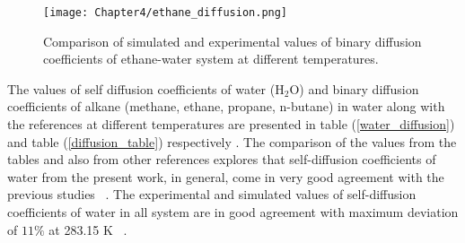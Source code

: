 \begin{figure}[h!]
 \centering
\texttt{[image: Chapter4/ethane\_diffusion.png]}
\caption[Comparison of simulated and experimental values of binary diffusion coefficients of ethane-water system.]{ Comparison of simulated and experimental values of binary diffusion coefficients of ethane-water system at different temperatures.}
\label{compare}
\end{figure}
 
 The values of self diffusion coefficients of water ($\mathrm{H_2O}$)  and binary diffusion coefficients of alkane (methane, ethane, propane, n-butane) in water   along with the references at different temperatures are presented in table  (\ref{water_diffusion}) and table (\ref{diffusion_table}) respectively . The comparison of the values from the tables and also from other references explores that self-diffusion coefficients of water from the present work, in general, come in very good agreement with the previous studies ~\citep{Pokhrel2016, Thapa2013, Poudyal2014, easteal1989diaphragm}. The experimental and simulated values of self-diffusion coefficients of water in all system are in good agreement with maximum  deviation of $11\%$  at 283.15 K ~\citep{easteal1989diaphragm}. 
